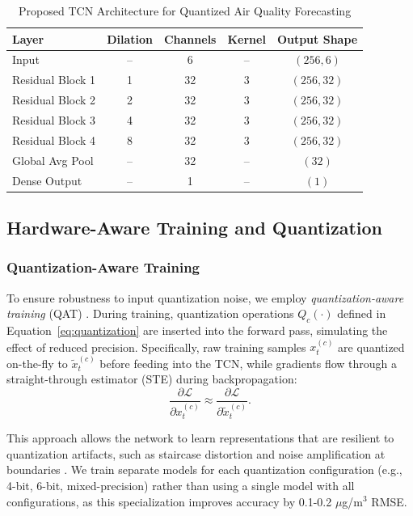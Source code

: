 \begin{table}[t]
\centering
\caption{Proposed TCN Architecture for Quantized Air Quality Forecasting}
\label{tab:tcn_architecture}
\begin{tabular}{lcccc}
\toprule
\textbf{Layer} & \textbf{Dilation} & \textbf{Channels} & \textbf{Kernel} & \textbf{Output Shape} \\
\midrule
Input & -- & 6 & -- & $(256, 6)$ \\
Residual Block 1 & 1 & 32 & 3 & $(256, 32)$ \\
Residual Block 2 & 2 & 32 & 3 & $(256, 32)$ \\
Residual Block 3 & 4 & 32 & 3 & $(256, 32)$ \\
Residual Block 4 & 8 & 32 & 3 & $(256, 32)$ \\
Global Avg Pool & -- & 32 & -- & $(32)$ \\
Dense Output & -- & 1 & -- & $(1)$ \\
\bottomrule
\end{tabular}
\end{table}

\subsection{Hardware-Aware Training and Quantization}

\subsubsection{Quantization-Aware Training}

To ensure robustness to input quantization noise, we employ \textit{quantization-aware training} (QAT) \cite{jacob2018qat}. During training, quantization operations $Q_c(\cdot)$ defined in Equation~\eqref{eq:quantization} are inserted into the forward pass, simulating the effect of reduced precision. Specifically, raw training samples $x_t^{(c)}$ are quantized on-the-fly to $\tilde{x}_t^{(c)}$ before feeding into the TCN, while gradients flow through a straight-through estimator (STE) \cite{bengio2013ste} during backpropagation:
\begin{equation}
\frac{\partial \mathcal{L}}{\partial x_t^{(c)}} \approx \frac{\partial \mathcal{L}}{\partial \tilde{x}_t^{(c)}}.
\label{eq:ste}
\end{equation}

This approach allows the network to learn representations that are resilient to quantization artifacts, such as staircase distortion and noise amplification at boundaries \cite{mazinani2025air}. We train separate models for each quantization configuration (e.g., 4-bit, 6-bit, mixed-precision) rather than using a single model with all configurations, as this specialization improves accuracy by 0.1-0.2 $\mu$g/m$^3$ RMSE.

